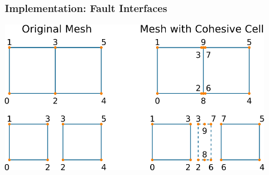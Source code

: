 \documentclass{beamer}
\begin{document}
\begin{frame}
  \frametitle{Implementation: Fault Interfaces}
 
   \vfill
   \begin{center}
     \includegraphics[width=4.5in]{figs/cohesivecells}
   \end{center}
   
 \end{frame}
 
\end{document}
